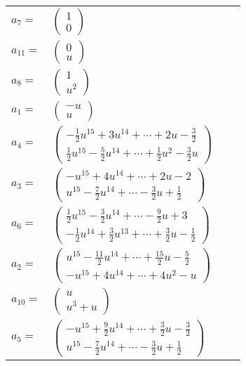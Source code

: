 \documentclass[1p]{elsarticle_modified}
\theoremstyle{definition}
\begin{document}
\begin{tabular}{m{7pt} m{180pt} m{7pt} m{180pt} }
\flushright $a_{7}=$&$\begin{pmatrix}1\\0\end{pmatrix}$ \\
\flushright $a_{11}=$&$\begin{pmatrix}0\\u\end{pmatrix}$ \\
\flushright $a_{8}=$&$\begin{pmatrix}1\\u^2\end{pmatrix}$ \\
\flushright $a_{1}=$&$\begin{pmatrix}- u\\u\end{pmatrix}$ \\
\flushright $a_{4}=$&$\begin{pmatrix}-\frac{1}{2} u^{15}+3 u^{14}+\cdots+2 u-\frac{3}{2}\\\frac{1}{2} u^{15}-\frac{5}{2} u^{14}+\cdots+\frac{1}{2} u^2-\frac{3}{2} u\end{pmatrix}$ \\
\flushright $a_{3}=$&$\begin{pmatrix}- u^{15}+4 u^{14}+\cdots+2 u-2\\u^{15}-\frac{7}{2} u^{14}+\cdots-\frac{3}{2} u+\frac{1}{2}\end{pmatrix}$ \\
\flushright $a_{6}=$&$\begin{pmatrix}\frac{1}{2} u^{15}-\frac{3}{2} u^{14}+\cdots-\frac{9}{2} u+3\\-\frac{1}{2} u^{14}+\frac{3}{2} u^{13}+\cdots+\frac{3}{2} u-\frac{1}{2}\end{pmatrix}$ \\
\flushright $a_{2}=$&$\begin{pmatrix}u^{15}-\frac{11}{2} u^{14}+\cdots+\frac{15}{2} u-\frac{5}{2}\\- u^{15}+4 u^{14}+\cdots+4 u^2- u\end{pmatrix}$ \\
\flushright $a_{10}=$&$\begin{pmatrix}u\\u^3+u\end{pmatrix}$ \\
\flushright $a_{5}=$&$\begin{pmatrix}- u^{15}+\frac{9}{2} u^{14}+\cdots+\frac{3}{2} u-\frac{3}{2}\\u^{15}-\frac{7}{2} u^{14}+\cdots-\frac{3}{2} u+\frac{1}{2}\end{pmatrix}$ \\

\end{tabular}
\end{document}
